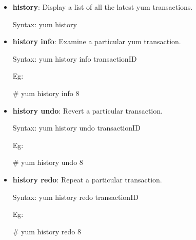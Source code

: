 \begin{flushleft}
\begin{itemize}
		\item \textbf{history}: Display a list of all the latest yum transactions.
		\begin{tcolorbox}[breakable,notitle,boxrule=-0pt,colback=pink,colframe=pink]
			\color{black}
			\font=9pt
			Syntax: yum history
			\font=4pt
		\end{tcolorbox}
		\bigskip
		\bigskip			

		\item \textbf{history info}: Examine a particular yum transaction.
		\begin{tcolorbox}[breakable,notitle,boxrule=-0pt,colback=pink,colframe=pink]
			\color{black}
			\font=9pt
			Syntax: yum history info transactionID
			\font=4pt
		\end{tcolorbox}
		Eg:
		\begin{tcolorbox}[breakable,notitle,boxrule=-0pt,colback=black,colframe=black]
			\color{green}
			\font=9pt
			\# yum history info 8
			\font=4pt
		\end{tcolorbox}
		\bigskip
		\bigskip			

		\item \textbf{history undo}: Revert a particular transaction.
		\begin{tcolorbox}[breakable,notitle,boxrule=-0pt,colback=pink,colframe=pink]
			\color{black}
			\font=9pt
			Syntax: yum history undo transactionID
			\font=4pt
		\end{tcolorbox}
		Eg:
		\begin{tcolorbox}[breakable,notitle,boxrule=-0pt,colback=black,colframe=black]
			\color{green}
			\font=9pt
			\# yum history undo 8
			\font=4pt
		\end{tcolorbox}
		\bigskip
		\bigskip			

		\item \textbf{history redo}: Repeat a particular transaction.
		\begin{tcolorbox}[breakable,notitle,boxrule=-0pt,colback=pink,colframe=pink]
			\color{black}
			\font=9pt
			Syntax: yum history redo transactionID
			\font=4pt
		\end{tcolorbox}
		Eg:
		\begin{tcolorbox}[breakable,notitle,boxrule=-0pt,colback=black,colframe=black]
			\color{green}
			\font=9pt
			\# yum history redo 8
			\font=4pt
		\end{tcolorbox}
		\bigskip
		\bigskip					
		

\end{itemize}
\end{flushleft}
